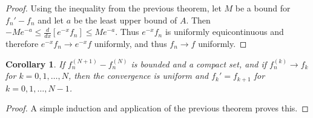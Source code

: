 \documentclass[crop=false,class=book]{standalone}
\theoremstyle{mystyle}
\newtheorem{corollary}{Corollary}[section]
\begin{document}
\begin{proof}
Using the inequality from the previous theorem, let $M$ be a bound for $f_n'-f_n$ and let $a$ be the least upper bound of $A$. Then $-Me^{-a}\leq \frac{d}{dx}[e^{-x}f_n] \leq Me^{-a}$. Thus $e^{-x}f_n$ is uniformly equicontinuous and therefore $e^{-x}f_n\rightarrow e^{-x}f$ uniformly, and thus $f_n\rightarrow f$ uniformly.
\end{proof}
\begin{corollary}
If $f_n^{(N+1)}-f_n^{(N)}$ is bounded and a compact set, and if $f_n^{(k)}\rightarrow f_k$ for $k=0,1,\hdots, N$, then the convergence is uniform and $f_{k}' = f_{k+1}$ for $k=0,1,\hdots,N-1$.
\end{corollary}
\begin{proof}
A simple induction and application of the previous theorem proves this.
\end{proof}
\end{document}
